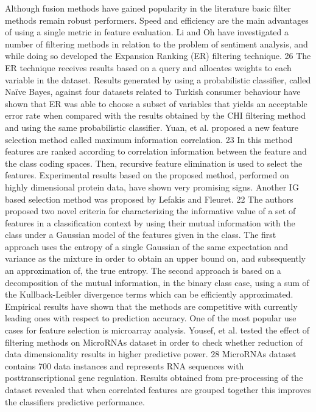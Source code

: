 \documentclass[review]{elsarticle}
\begin{document}
Although fusion methods have gained popularity in the literature basic filter methods remain robust performers. Speed and efficiency are the main advantages of using a single metric in feature evaluation. Li and Oh have investigated a number of filtering methods in relation to the problem of sentiment analysis, and while doing so developed the Expansion Ranking (ER) filtering technique.\cite{Li2016} 26  The ER technique receives results based on a query and allocates weights to each variable in the dataset. Results generated by using a probabilistic classifier, called Naïve Bayes, against four datasets related to Turkish consumer behaviour have shown that ER was able to choose a subset of variables that yields an acceptable error rate when compared with the results obtained by the CHI filtering method and using the same probabilistic classifier. Yuan, et al.  proposed a new feature selection method called maximum information correlation.\cite{Yuan2017} 23 In this method features are ranked according to correlation information between the feature and the class coding spaces. Then, recursive feature elimination is used to select the features. Experimental results based on the proposed method, performed on highly dimensional protein data, have shown very promising signs. Another IG based selection method was proposed by Lefakis and Fleuret.\cite{Lefakis2016} 22  The authors proposed two novel criteria for characterizing the informative value of a set of features in a classification context by using their mutual information with the class under a Gaussian model of the features given in the class. The first approach uses the entropy of a single Gaussian of the same expectation and variance as the mixture in order to obtain an upper bound on, and subsequently an approximation of, the true entropy. The second approach is based on a decomposition of the mutual information, in the binary class case, using a sum of the Kullback-Leibler divergence terms which can be efficiently approximated. Empirical results have shown that the methods are competitive with currently leading ones with respect to prediction accuracy. One of the most popular use cases for feature selection is microarray analysis. Yousef, et al. tested the effect of filtering methods on MicroRNAs dataset in order to check whether reduction of data dimensionality results in higher predictive power.\cite{Yousef2016} 28 MicroRNAs dataset contains 700 data instances and represents RNA sequences with posttranscriptional gene regulation. Results obtained from pre-processing of the dataset revealed that when correlated features are grouped together this improves the classifiers predictive performance.
\end{document}
